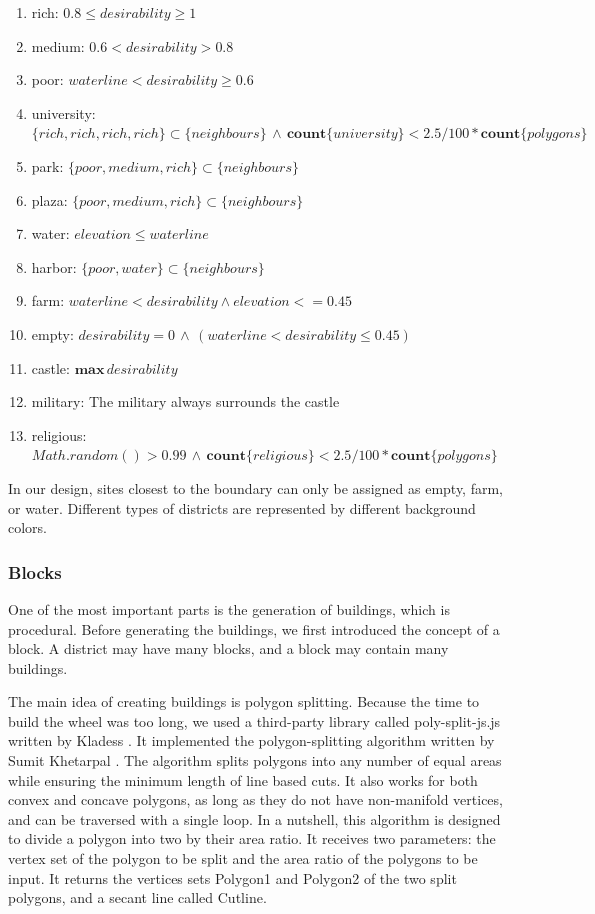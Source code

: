 \begin{enumerate}
  \item rich: $0.8 \leq desirability \geq 1$
  \item medium: $0.6 < desirability > 0.8$
  \item poor: $waterline < desirability \geq 0.6$
  \item university: $\{rich, rich, rich, rich\} \subset \{neighbours\} \, \wedge \, \mathbf{count} \{university\} < 2.5 / 100 * \mathbf{count} \{polygons\}$
  \item park: $\{poor, medium, rich\} \subset \{neighbours\}$
  \item plaza: $\{poor, medium, rich\} \subset \{neighbours\}$
  \item water: $elevation \leq waterline$
  \item harbor: $\{poor, water\} \subset \{neighbours\}$
  \item farm: $waterline < desirability \wedge elevation <= 0.45$
  \item empty: $desirability = 0 \, \wedge \, (waterline < desirability \leq 0.45)$
  \item castle: $\mathbf{max}\,desirability$
  \item military: The military always surrounds the castle
  \item religious: $Math.random() > 0.99 \, \wedge \, \mathbf{count} \{religious\} < 2.5 / 100 * \mathbf{count} \{polygons\}$
\end{enumerate}

In our design, sites closest to the boundary can only be assigned as empty, farm, or water. Different types of districts are represented by different background colors.

\subsubsection{Blocks}
One of the most important parts is the generation of buildings, which is procedural. Before generating the buildings, we first introduced the concept of a block. A district may have many blocks, and a block may contain many buildings.

The main idea of creating buildings is polygon splitting. Because the time to build the wheel was too long, we used a third-party library called poly-split-js.js written by Kladess \cite{web:Poly-split-js}. It implemented the polygon-splitting algorithm written by Sumit Khetarpal \cite{web:Polygon-splitting}. The algorithm splits polygons into any number of equal areas while ensuring the minimum length of line based cuts. It also works for both convex and concave polygons, as long as they do not have non-manifold vertices, and can be traversed with a single loop. In a nutshell, this algorithm is designed to divide a polygon into two by their area ratio. It receives two parameters: the vertex set of the polygon to be split and the area ratio of the polygons to be input. It returns the vertices sets Polygon1 and Polygon2 of the two split polygons, and a secant line called Cutline.

